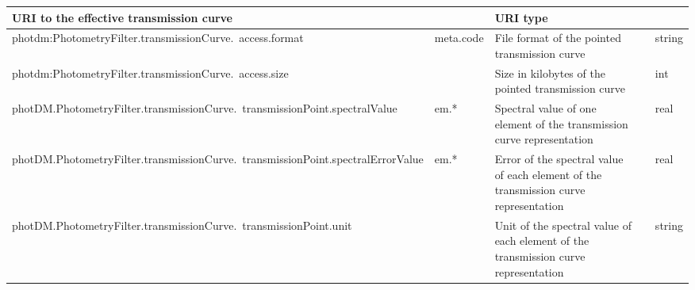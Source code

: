 \documentclass[11pt,a4paper]{ivoa}
\begin{document}
\begin{appendices}
\begin{table}[H]
\begin{adjustbox}{angle=90}
\begin{tabular}{p{2.5in}|p{1.5in}|p{2in}|p{0.74in}|p{0.35in}}
\multicolumn{1}{p{2in}}{{\fontsize{8pt}{8pt}\selectfont URI to the
effective transmission curve}} &
\multicolumn{1}{p{0.74in}}{} &
\multicolumn{1}{p{0.35in}}{{\fontsize{8pt}{8pt}\selectfont URI type}} \\
\hline
\multicolumn{1}{p{2.5in}}{{\fontsize{8pt}{8pt}
\selectfont photdm:PhotometryFilter.transmissionCurve.\ access.format}} &
\multicolumn{1}{p{1.5in}}{{\fontsize{8pt}{8pt}\selectfont meta.code}} &
\multicolumn{1}{p{2in}}{{\fontsize{8pt}{8pt}\selectfont File format of the pointed transmission curve}} &
\multicolumn{1}{p{0.74in}}{} &
\multicolumn{1}{p{0.35in}}{{\fontsize{8pt}{8pt}\selectfont string}} \\
\hline
\multicolumn{1}{p{2.5in}}{{\fontsize{8pt}{8pt}
\selectfont photdm:PhotometryFilter.transmissionCurve.\ access.size}} &
\multicolumn{1}{p{1.5in}}{{\fontsize{8pt}{8pt}\selectfont }} &
\multicolumn{1}{p{2in}}{{\fontsize{8pt}{8pt}\selectfont Size in kilobytes of the pointed transmission curve}} &
\multicolumn{1}{p{0.74in}}{} &
\multicolumn{1}{p{0.35in}}{{\fontsize{8pt}{8pt}\selectfont int}} \\
\hline
\multicolumn{1}{p{2.5in}}{{\fontsize{8pt}{8pt}
\selectfont photDM.PhotometryFilter.transmissionCurve.\ transmissionPoint.spectralValue}} &
\multicolumn{1}{p{1.5in}}{{\fontsize{8pt}{8pt}\selectfont em.*}} &
\multicolumn{1}{p{2in}}{{\fontsize{8pt}{8pt}\selectfont Spectral value
of one element of the transmission curve representation}} &
\multicolumn{1}{p{0.74in}}{} &
\multicolumn{1}{p{0.35in}}{{\fontsize{8pt}{8pt}\selectfont real}} \\
\hline
\multicolumn{1}{p{2.5in}}{{\fontsize{8pt}{8pt}
\selectfont photDM.PhotometryFilter.transmissionCurve.\ transmissionPoint.spectralErrorValue}} &
\multicolumn{1}{p{1.5in}}{{\fontsize{8pt}{8pt}\selectfont em.*}} &
\multicolumn{1}{p{2in}}{{\fontsize{8pt}{8pt}\selectfont Error of the spectral value
of each element of the transmission curve representation}} &
\multicolumn{1}{p{0.74in}}{} &
\multicolumn{1}{p{0.35in}}{{\fontsize{8pt}{8pt}\selectfont real}} \\
\hline
\multicolumn{1}{p{2.5in}}{{\fontsize{8pt}{8pt}
\selectfont photDM.PhotometryFilter.transmissionCurve.\ transmissionPoint.unit}} &
\multicolumn{1}{p{1.5in}}{{\fontsize{8pt}{8pt}\selectfont }} &
\multicolumn{1}{p{2in}}{{\fontsize{8pt}{8pt}\selectfont Unit of the spectral value
of each element of the transmission curve representation}} &
\multicolumn{1}{p{0.74in}}{} &
\multicolumn{1}{p{0.35in}}{{\fontsize{8pt}{8pt}\selectfont string}} \\

\end{tabular}
\end{adjustbox}
\end{table}
\end{appendices}
\end{document}

